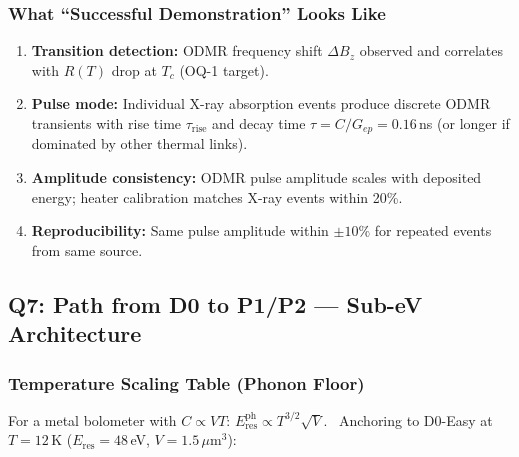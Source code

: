 \subsubsection{What ``Successful Demonstration'' Looks Like}
\label{sec:q6_merit}

\begin{enumerate}
  \item \textbf{Transition detection:} ODMR frequency shift $\Delta B_z$ observed
    and correlates with $R(T)$ drop at $T_c$ (OQ-1 target).
  \item \textbf{Pulse mode:} Individual X-ray absorption events produce discrete
    ODMR transients with rise time $\tau_\mathrm{rise}$ and decay time
    $\tau = C/G_{ep} = 0.16$\,ns (or longer if dominated by other thermal links).
  \item \textbf{Amplitude consistency:} ODMR pulse amplitude scales with deposited
    energy; heater calibration matches X-ray events within 20\%.
  \item \textbf{Reproducibility:} Same pulse amplitude within $\pm10\%$ for
    repeated events from same source.
\end{enumerate}

\subsection{Q7: Path from D0 to P1/P2 --- Sub-eV Architecture}
\label{sec:q7}

\subsubsection{Temperature Scaling Table (Phonon Floor)}
\label{sec:q7_temperature}

For a metal bolometer with $C \propto VT$:
$E_\mathrm{res}^\mathrm{ph} \propto T^{3/2} \sqrt{V}$.~\cite{Richards1994}
Anchoring to D0-Easy at $T = 12$\,K ($E_\mathrm{res} = 48$\,eV,
$V = 1.5\,\mu$m$^3$):

